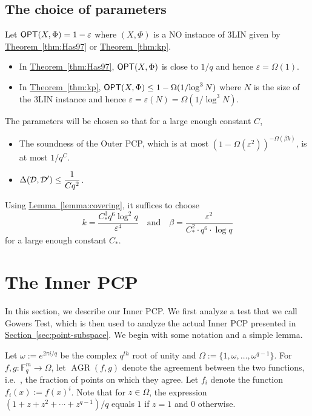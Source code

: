 \documentclass[10pt]{article}
\theoremstyle{definition}
\providecommand{\ie}{i.e.\ }
\numberwithin{equation}{section}
\newcommand{\expref}[2]{\texorpdfstring{\hyperref[#2]{#1~\ref{#2}}}{#1~\ref{#2}}}
\newcommand\F{\mathbb{F}}
\DeclareMathOperator\OPT{{\sf OPT}}
\DeclareMathOperator\AGR{AGR}
\newcommand{\eps}{\varepsilon}
\renewcommand{\mapsto}{\to}
\begin{document}
\subsection{The choice of parameters}\label{sec:param}

Let $\OPT(X,\Phi)=1-\eps$ where $(X,\Phi)$ is a NO instance of 3LIN given by \expref{Theorem}{thm:Has97} or
\expref{Theorem}{thm:kp}.
\begin{itemize}
\item In \expref{Theorem}{thm:Has97}, $\OPT(X,\Phi)$ is close to ${1}/{q}$ and hence
$\eps = \Omega(1)$.
\item In \expref{Theorem}{thm:kp},
$\OPT(X,\Phi) \leq 1-\Omega({1}/{\log^3 N})$ where $N$ is the
size of the 3LIN instance and hence $\eps = \eps(N) =  \Omega({1}/{\log^3 N})$.
\end{itemize}
The parameters will be chosen so that for a large enough constant $C$,
\begin{itemize}
\item The soundness of the Outer PCP, which is at most $(1-\Omega(\eps^2))^{-\Omega(\beta k)}$,
      is at most ${1}/{q^{C}}$.
\item $\displaystyle \Delta({\cal D}, {\cal D}') \leq \frac{1}{C q^2}$.
\end{itemize}
Using \expref{Lemma}{lemma:covering},
it suffices to choose 
\[
k = \frac{C_*^3  q^6 \log^2 q}{\eps^4} \quad \text{and}\quad
\beta = \frac{\eps^2}{C_*^2 \cdot q^6 \cdot \log q}
\]
for a large enough constant $C_*$.







%
%
%
%
%
%
%
%
%
%
%
%
%
%



\section{The Inner PCP}

In this section, we describe our Inner PCP\@. We first analyze a test that we call Gowers Test,
which is then used to analyze the actual Inner PCP presented in \expref{Section}{sec:point-subspace}. We begin with
some notation and a simple lemma.

Let $\omega := e^{2\pi i/q}$ be the complex $q^{th}$ root of unity and $\Omega := \{1, \omega,
\ldots, \omega^{q-1} \}$. For $f, g : \F_q^m \mapsto \Omega$, let $\AGR(f,g)$ denote the agreement
between the two functions, \ie, the fraction of points on which they agree.
Let $f_i$ denote the function $f_i(x) := f(x)^i$. Note that for $z \in \Omega$, the expression
$(1+z+z^2+\cdots+z^{q-1})/q$ equals $1$ if $z=1$ and $0$ otherwise.
\end{document}
